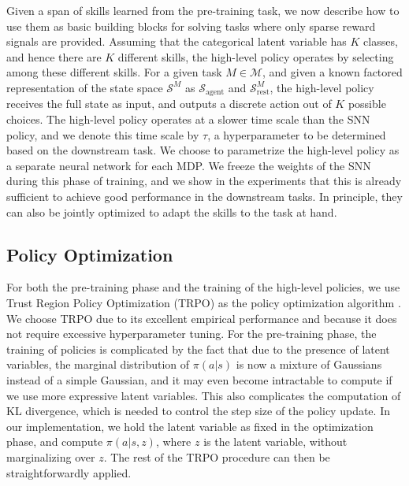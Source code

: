 \documentclass{article} %
\newcommand{\sset}{\mathcal{S}}
\newcommand{\mdpset}{\mathcal{M}}
\newcommand{\agent}{\mathrm{agent}}
\begin{document}
Given a span of skills learned from the pre-training task, we now describe how to use them as basic building blocks for solving tasks where only sparse reward signals are provided. Assuming that the categorical latent variable has $K$ classes, and hence there are $K$ different skills, the high-level policy operates by selecting among these different skills. For a given task $M \in \mdpset$, and given a known factored representation of the state space $\sset^M$ as $\sset_\agent$ and $\sset_{\mathrm{rest}}^M$, the high-level policy receives the full state as input, and outputs a discrete action out of $K$ possible choices. The high-level policy operates at a slower time scale than the SNN policy, and we denote this time scale by $\tau$, a hyperparameter to be determined based on the downstream task. We choose to parametrize the high-level policy as a separate neural network for each MDP. We freeze the weights of the SNN during this phase of training, and we show in the experiments that this is already sufficient to achieve good performance in the downstream tasks. In principle, they can also be jointly optimized to adapt the skills to the task at hand. %

\subsection{Policy Optimization}
\label{section:method:polopt}

For both the pre-training phase and the training of the high-level policies, we use Trust Region Policy Optimization (TRPO) as the policy optimization algorithm \citep{Schulman15TRPO}. We choose TRPO due to its excellent empirical performance and because it does not require excessive hyperparameter tuning. For the pre-training phase, the training of policies is complicated by the fact that due to the presence of latent variables, the marginal distribution of $\pi(a|s)$ is now a mixture of Gaussians instead of a simple Gaussian, and it may even become intractable to compute if we use more expressive latent variables. This also complicates the computation of KL divergence, which is needed to control the step size of the policy update. In our implementation, we hold the latent variable as fixed in the optimization phase, and compute $\pi(a|s,z)$, where $z$ is the latent variable, without marginalizing over $z$. The rest of the TRPO procedure can then be straightforwardly applied. %
\end{document}
